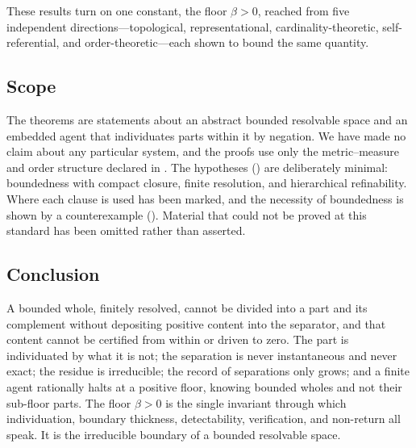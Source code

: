 \documentclass[11pt,a4paper]{article}
\theoremstyle{thmstyle}
\theoremstyle{definition}
\theoremstyle{remark}
\newcommand{\thick}{\beta}
\begin{document}
These results turn on one constant, the floor $\thick>0$, reached from five
independent directions---topological, representational, cardinality-theoretic,
self-referential, and order-theoretic---each shown to bound the same quantity.

\subsection{Scope}

The theorems are statements about an abstract bounded resolvable space and an
embedded agent that individuates parts within it by negation. We have made no
claim about any particular system, and the proofs use only the metric--measure
and order structure declared in . The hypotheses
() are deliberately minimal: boundedness with compact closure,
finite resolution, and hierarchical refinability. Where each clause is used has
been marked, and the necessity of boundedness is shown by a counterexample
(). Material that could not be proved at this standard
has been omitted rather than asserted.

\subsection{Conclusion}

A bounded whole, finitely resolved, cannot be divided into a part and its
complement without depositing positive content into the separator, and that
content cannot be certified from within or driven to zero. The part is
individuated by what it is not; the separation is never instantaneous and never
exact; the residue is irreducible; the record of separations only grows; and a
finite agent rationally halts at a positive floor, knowing bounded wholes and not
their sub-floor parts. The floor $\thick>0$ is the single invariant through which
individuation, boundary thickness, detectability, verification, and non-return
all speak. It is the irreducible boundary of a bounded resolvable space.



\end{document}
